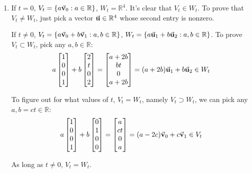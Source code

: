 \documentclass{article}
\begin{document}
\begin{exercise}{12}
\begin{enumerate}
\item If $t=0$, $V_t = \{a\vec{\mathbf{v}}_0:a\in\mathbb{R}\}$, $W_t = \mathbb{R}^4$. It's clear that $V_t \in W_t$. To prove that $V_t \neq W_t$, just pick a vector  $\vec{\mathbf{u}} \in \mathbb{R}^4$ whose second entry is nonzero.

If $t\neq 0$,  $V_t = \{a\vec{\mathbf{v}}_0+b\vec{\mathbf{v}}_1:a,b\in\mathbb{R}\}$, $W_t = \{a\vec{\mathbf{u}}_1 + b\vec{\mathbf{u}}_2 : a, b \in \mathbb{R}\}$. To prove $V_t \subset W_t$, pick any $a,b \in \mathbb{R}$:
$$a\begin{bmatrix}1\\0\\0\\1\end{bmatrix} + b\begin{bmatrix}2\\t\\0\\2\end{bmatrix} = \begin{bmatrix}a+2b\\bt\\0\\a+2b\end{bmatrix} = (a+2b)\vec{\mathbf{u}}_1 + b\vec{\mathbf{u}}_2 \in W_t$$

To figure out for what values of $t$, $V_t = W_t$, namely $V_t \supset W_t$, we can pick any $a, b=ct \in \mathbb{R}$:
$$a\begin{bmatrix}1\\0\\0\\1\end{bmatrix} + b\begin{bmatrix}0\\1\\0\\0\end{bmatrix} = \begin{bmatrix}a\\ct\\0\\a\end{bmatrix} = (a-2c)\vec{\mathbf{v}}_0 + c\vec{\mathbf{v}}_1 \in V_t$$

As long as $t \neq 0$, $V_t = W_t$.
\end{enumerate}
\end{exercise}
\end{document}
